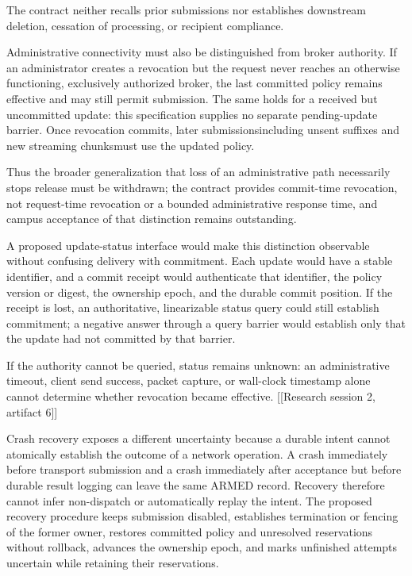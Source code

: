\documentclass[11pt]{article}
\begin{document}
The contract neither recalls prior submissions nor establishes downstream deletion, cessation of processing, or recipient compliance.

Administrative connectivity must also be distinguished from broker authority. If an administrator creates a revocation but the request never reaches an otherwise functioning, exclusively authorized broker, the last committed policy remains effective and may still permit submission. The same holds for a received but uncommitted update: this specification supplies no separate pending-update barrier. Once revocation commits, later submissions\textemdash{}including unsent suffixes and new streaming chunks\textemdash{}must use the updated policy.

Thus the broader generalization that loss of an administrative path necessarily stops release must be withdrawn; the contract provides commit-time revocation, not request-time revocation or a bounded administrative response time, and campus acceptance of that distinction remains outstanding.

A proposed update-status interface would make this distinction observable without confusing delivery with commitment. Each update would have a stable identifier, and a commit receipt would authenticate that identifier, the policy version or digest, the ownership epoch, and the durable commit position. If the receipt is lost, an authoritative, linearizable status query could still establish commitment; a negative answer through a query barrier would establish only that the update had not committed by that barrier.

If the authority cannot be queried, status remains unknown: an administrative timeout, client send success, packet capture, or wall-clock timestamp alone cannot determine whether revocation became effective. [[Research session 2, artifact 6]]

Crash recovery exposes a different uncertainty because a durable intent cannot atomically establish the outcome of a network operation. A crash immediately before transport submission and a crash immediately after acceptance but before durable result logging can leave the same ARMED record. Recovery therefore cannot infer non-dispatch or automatically replay the intent. The proposed recovery procedure keeps submission disabled, establishes termination or fencing of the former owner, restores committed policy and unresolved reservations without rollback, advances the ownership epoch, and marks unfinished attempts uncertain while retaining their reservations.
\end{document}
